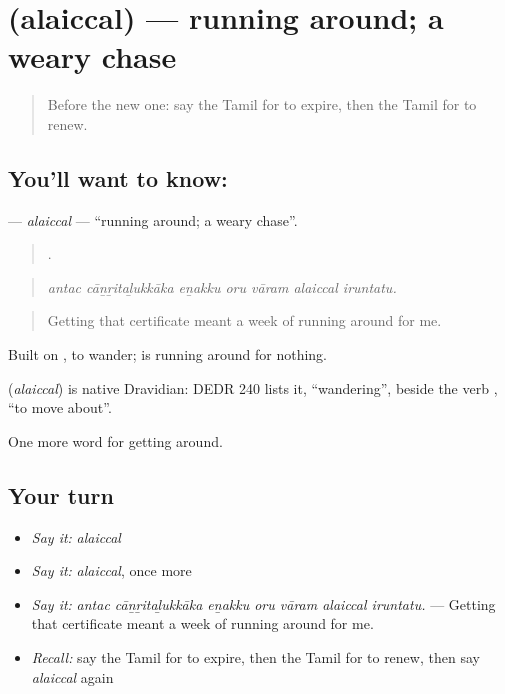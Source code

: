 \section[\texorpdfstring{\ta{அலைச்சல்} (alaiccal)}{அலைச்சல் (alaiccal)}]{ (alaiccal) — running around; a weary chase}

\label{lesson:TA-C415-alaiccal}



\begin{quote}
Before the new one: say the Tamil for to expire, then the Tamil for to renew.
\end{quote}

\subsection*{You'll want to know: }
\textbf{} — \emph{alaiccal} — \textquotedblleft{}running around; a weary chase\textquotedblright{}.

\begin{quote}
      .
\end{quote}

\begin{quote}
\emph{antac cāṉṟitaḻukkāka eṉakku oru vāram alaiccal iruntatu.}
\end{quote}

\begin{quote}
Getting that certificate meant a week of running around for me.
\end{quote}

Built on , to wander;   is running around for nothing.

\begin{cousinweb}
\textbf{} (\emph{alaiccal}) is native Dravidian: DEDR 240 lists it, \textquotedblleft{}wandering\textquotedblright{}, beside the verb , \textquotedblleft{}to move about\textquotedblright{}.
\end{cousinweb}

\begin{grammarlens}[title={What you've built}]
One more word for getting around.
\end{grammarlens}

\subsection*{Your turn}
\begin{itemize}
\raggedright
  \item \emph{Say it:} \emph{alaiccal}
  \item \emph{Say it:} \emph{alaiccal}, once more
  \item \emph{Say it:} \emph{antac cāṉṟitaḻukkāka eṉakku oru vāram alaiccal iruntatu.} — Getting that certificate meant a week of running around for me.
  \item \emph{Recall:} say the Tamil for to expire, then the Tamil for to renew, then say \emph{alaiccal} again
\end{itemize}

